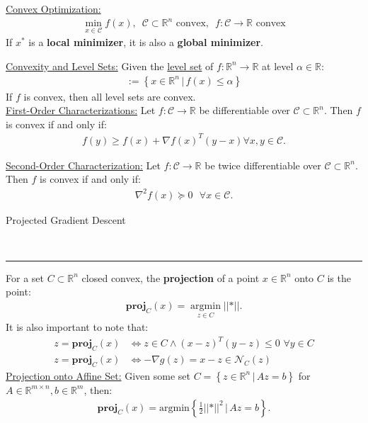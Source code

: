 \documentclass{article}
\newcommand{\header}[1]{\begin{large}\noindent #1\end{large}\\\rule{\textwidth}{0.5pt}}
\newcommand{\norm}[2]{\left\lvert\left\lvert#1\right\rvert\right\rvert}
\newcommand{\sheader}[1]{\underline{#1:}}
\newcommand{\gap}{\medskip\\}
\newcommand{\curly}[1]{\left\{#1\right\}}
\begin{document}
\sheader{Convex Optimization}
\begin{align*}
    \min_{x \in \mathcal{C}} f(x), \,\,\, \mathcal{C} \subset \mathbb{R}^n \textrm{ convex}, \,\,\, f: \mathcal{C}\to \mathbb{R} \textrm{ convex}
\end{align*}
If $x^*$ is a \textbf{local minimizer}, it is also a \textbf{global minimizer}.
\pagebreak

\sheader{Convexity and Level Sets} Given the \underline{level set} of $f : \mathbb{R}^n \to \mathbb{R}$
at level $\alpha \in \mathbb{R}$:
\begin{align*}
    [f \leq \alpha] := \curly{x \in \mathbb{R}^n \,|\, f(x) \leq \alpha}
\end{align*}
If $f$ is convex, then all level sets are convex.
\gap
\sheader{First-Order Characterizations} Let $f : \mathcal{C} \to \mathbb{R}$
be differentiable over $\mathcal{C} \subset \mathbb{R}^n$. Then $f$ is 
convex if and only if:
\begin{align*}
    f(y) \geq f(x) + \nabla f(x)^T(y-x) \forall x, y \in \mathcal{C}.
\end{align*}

\sheader{Second-Order Characterization} Let $f : \mathcal{C} \to \mathbb{R}$
be twice differentiable over $\mathcal{C} \subset \mathbb{R}^n$. Then 
$f$ is convex if and only if:
\begin{align*}
    \nabla^2 f(x) \succeq 0\,\,\,\, \forall x \in \mathcal{C}.
\end{align*}

\header{Projected Gradient Descent}

For a set ${C} \subset \mathbb{R}^n$ closed convex, the 
\textbf{projection} of a point $x \in \mathbb{R}^n$ onto 
$C$ is the point:
\begin{align*}
    \mathbf{proj}_C(x) = \underset{z\in C}{\operatorname{argmin}}\norm*{x-z}.
\end{align*}
It is also important to note that:
\begin{align*}
    z = \mathbf{proj}_C(x) &\iff z\in C \wedge (x-z)^T(y-z)\leq 0\,\, \forall y\in C\\
    z = \mathbf{proj}_C(x) &\iff -\nabla g(z) = x- z \in \mathcal{N}_C(z)
\end{align*}
\sheader{Projection onto Affine Set} Given some set 
$C = \curly{z \in \mathbb{R}^n \,|\, Az = b}$ for $A \in \mathbb{R}^{m \times n}, b \in \mathbb{R}^m$, 
then:
\begin{align*}
    \mathbf{proj}_C(x) = \textrm{argmin}\curly{\frac{1}{2} \norm*{z-x}^2 \,|\, Az = b}.
\end{align*}
\end{document}
